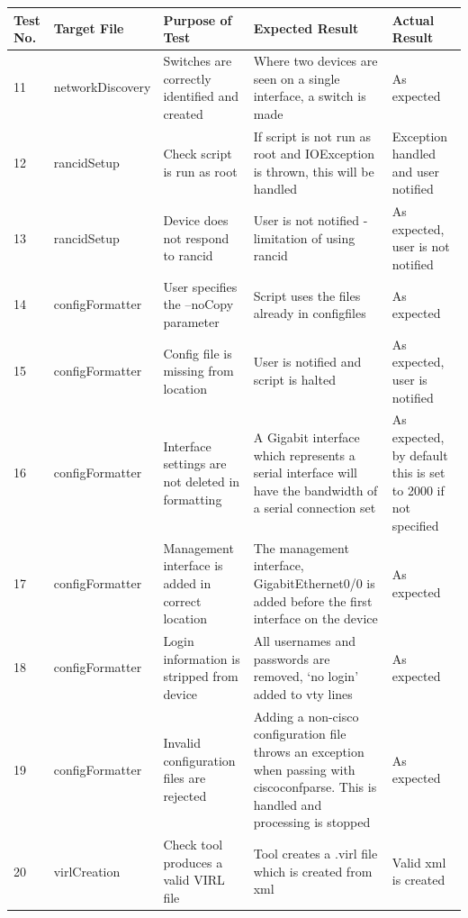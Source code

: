 \documentclass[11pt]{report}
\begin{document}
\begin{tabular}{|p{0.6cm}|p{3.0cm}|p{3cm}|p{3.5cm}|p{3.5cm}|}
	\hline \textbf{Test No.} & \textbf{Target File} & \textbf{Purpose of Test} & \textbf{Expected Result} & \textbf{Actual Result} \\ 
	\hline 11 & networkDiscovery & Switches are correctly identified and created & Where two devices are seen on a single interface, a switch is made & As expected  \\ 
	\hline 12 & rancidSetup & Check script is run as root & If script is not run as root and IOException is thrown, this will be handled & Exception handled and user notified    \\ 
	\hline 13 & rancidSetup & Device does not respond to rancid & User is not notified - limitation of using rancid & As expected, user is not notified  \\ 
	\hline 14 & configFormatter & User specifies the --noCopy parameter & Script uses the files already in config\-files & As expected  \\ 
	\hline 15 & configFormatter & Config file is missing from location & User is notified and script is halted & As expected, user is notified  \\
	\hline 16 & configFormatter & Interface settings are not deleted in formatting & A Gigabit interface which represents a serial interface will have the bandwidth of a serial connection set & As expected, by default this is set to 2000 if not specified  \\
	\hline 17 & configFormatter & Management interface is added in correct location & The management interface, GigabitEthernet0/0 is added before the first interface on the device & As expected  \\
	\hline 18 & configFormatter & Login information is stripped from device & All usernames and passwords are removed, `no login' added to vty lines & As expected  \\
	\hline 19 & configFormatter & Invalid configuration files are rejected & Adding a non-cisco configuration file throws an exception when passing with ciscoconfparse. This is handled and processing is stopped & As expected  \\
	\hline 20 & virlCreation & Check tool produces a valid VIRL file & Tool creates a .virl file which is created from xml & Valid xml is created  \\
	\hline
\end{tabular}
\end{document}
